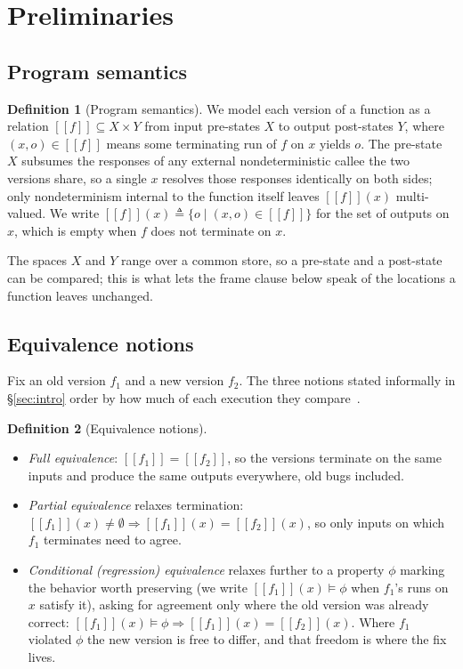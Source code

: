 \documentclass[conference]{IEEEtran}
\theoremstyle{definition}
\newtheorem{definition}{Definition}
\theoremstyle{remark}
\newcommand{\sem}[1]{[\![#1]\!]}
\begin{document}
\section{Preliminaries}\label{sec:background}

\subsection{Program semantics}\label{subsec:semantics}
\begin{definition}[Program semantics]\label{def:semantics}
  We model each version of a function as a relation
  $\sem{f}\subseteq X\times Y$ from input pre-states $X$ to output
  post-states $Y$, where $(x,o)\in\sem{f}$ means some terminating run of
  $f$ on $x$ yields $o$. The pre-state $X$ subsumes the responses of any
  external nondeterministic callee the two versions share,
  so a single $x$
  resolves those responses identically on both sides; only
  nondeterminism internal to the function itself leaves $\sem{f}(x)$
  multi-valued. We write
  $\sem{f}(x)\triangleq\{o\mid(x,o)\in\sem{f}\}$ for the set of outputs
  on $x$, which is empty when $f$ does not terminate on $x$.
\end{definition}
The spaces $X$ and $Y$ range over a common store, so a pre-state and a
post-state can be compared; this is what lets the frame clause below
speak of the locations a function leaves unchanged.

\subsection{Equivalence notions}\label{subsec:equiv}

Fix an old version $f_1$ and a new version $f_2$. The three notions
stated informally in \S\ref{sec:intro} order by how much of each
execution they compare~\cite{godlin2009rv,godlin2013rv}.

\begin{definition}[Equivalence notions]\label{def:equiv}
  \begin{itemize}
    \item \emph{Full equivalence}:
      $\sem{f_1}=\sem{f_2}$, so the versions terminate on the same inputs
      and produce the same outputs everywhere, old bugs included.
    \item \emph{Partial equivalence}
      relaxes termination: $\sem{f_1}(x) \neq \emptyset \Rightarrow
      \sem{f_1}(x)=\sem{f_2}(x)$, so only inputs on which $f_1$ terminates
      need to agree.
    \item \emph{Conditional (regression)
      equivalence} relaxes further to a
      property $\phi$ marking the behavior worth preserving (we write
      $\sem{f_1}(x) \models \phi$ when $f_1$'s runs on $x$ satisfy it),
      asking for agreement only where the old version was already correct:
      $\sem{f_1}(x) \models \phi \Rightarrow \sem{f_1}(x) = \sem{f_2}(x)$.
      Where $f_1$ violated $\phi$ the new version is free to differ, and
      that freedom is where the fix lives.
  \end{itemize}
\end{definition}
\end{document}
